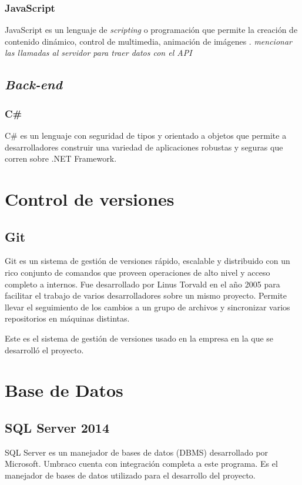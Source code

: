 \subsubsection{JavaScript}
JavaScript es un lenguaje de \textit{scripting} o programación que permite la creación de contenido dinámico, control de multimedia, animación de imágenes \cite{jsMozilla}. \emph{mencionar las llamadas al servidor para traer datos con el API}


\subsection{\emph{Back-end}}
\subsubsection{C\#}
C\# es un lenguaje con seguridad de tipos y orientado a objetos que permite a desarrolladores construir una variedad de aplicaciones robustas y seguras que corren sobre .NET Framework. \cite{cSharpMicrosoft}

\section{Control de versiones}
\subsection{Git}
Git es un sistema de gestión de versiones rápido, escalable y distribuido con un rico conjunto de comandos que proveen operaciones de alto nivel y acceso completo a internos. \cite{gitGit} Fue desarrollado por Linus Torvald en el año 2005 para facilitar el trabajo de varios desarrolladores sobre un mismo proyecto. Permite llevar el seguimiento de los cambios a un grupo de archivos y sincronizar varios repositorios en máquinas distintas.

Este es el sistema de gestión de versiones usado en la empresa en la que se desarrolló el proyecto.

\section{Base de Datos}
\subsection{SQL Server 2014}
SQL Server es un manejador de bases de datos (DBMS) desarrollado por Microsoft. Umbraco cuenta con integración completa a este programa. Es el manejador de bases de datos utilizado para el desarrollo del proyecto.

